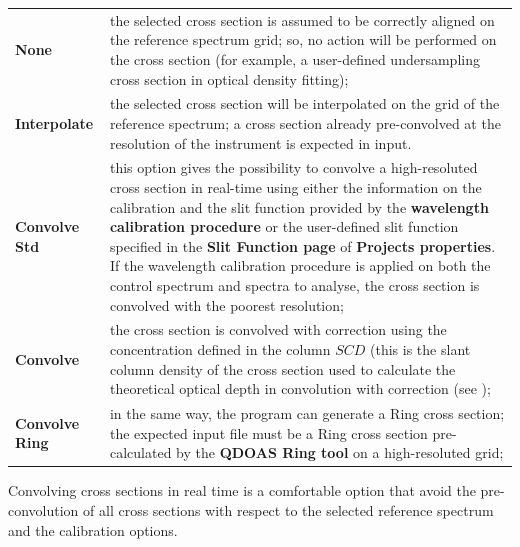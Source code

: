 \begin{longtable}[h]{l p{8cm}}
\textbf{None} & the selected cross section is assumed to be correctly aligned on the reference spectrum grid; so, no action will be performed on the cross section (for example, a user-defined undersampling cross section in optical density fitting); \\ [6pt]
\textbf{Interpolate} & the selected cross section will be interpolated on the grid of the reference spectrum; a cross section already pre-convolved at the resolution of the instrument is expected in input. \\ [6pt]
\textbf{Convolve Std} & this option gives the possibility to convolve a high-resoluted cross section in real-time using either the information on the calibration and the slit function provided by the \textbf{wavelength calibration procedure} or the user-defined slit function specified in the \textbf{Slit Function page} of \textbf{Projects properties}. If the wavelength calibration procedure is applied on both the control spectrum and spectra to analyse, the cross section is convolved with the poorest resolution; \\ [6pt]
\textbf{Convolve \I0} & the cross section is convolved with \I0 correction using the concentration defined in the column \textbf{$SCD$ \I0} (this is the slant column density of the cross section used to calculate the theoretical optical depth in convolution with \I0 correction (see \citet{aliwell_2002}); \\ [6pt]
\textbf{Convolve Ring} &	in the same way, the program can generate a Ring cross section; the expected input file must be a Ring cross section pre-calculated by the \textbf{QDOAS Ring tool} on a high-resoluted grid;  \\ [6pt]
\end{longtable}

Convolving cross sections in real time is a comfortable option that avoid the pre-convolution of all cross sections with respect to the selected reference spectrum and the calibration options.

